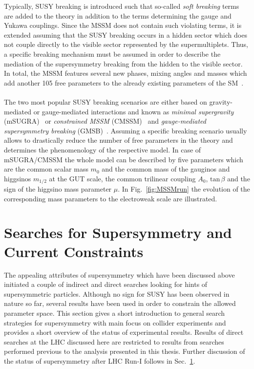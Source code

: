 Typically, SUSY breaking is introduced such that so-called \textit{soft breaking} terms are added to the theory in addition to the terms determining the gauge and Yukawa couplings. Since the MSSM does not contain such violating terms, it is extended assuming that the SUSY breaking occurs in a hidden sector which does not couple directly to the visible sector represented by the supermultiplets. Thus, a specific breaking mechanism must be assumed in order to describe the mediation of the supersymmetry breaking from the hidden to the visible sector. In total, the MSSM features several new phases, mixing angles and masses which add another 105 free parameters to the already existing parameters of the SM~\cite{Dimopoulos:1995ju}.  \\
\\
The two most popular SUSY breaking scenarios are either based on gravity-mediated or gauge-mediated interactions and known as \textit{minimal supergravity} (mSUGRA)~\cite{Chamseddine:1982jx, AlvarezGaume:1983gj} or \textit{constrained MSSM} (CMSSM)~\cite{Kane:1993td, Baer:2002gm} and \textit{gauge-mediated supersymmetry breaking} (GMSB)~\cite{Dine:1981gu, AlvarezGaume:1981wy}. Assuming a specific breaking scenario usually allows to drastically reduce the number of free parameters in the theory and determines the phenomenology of the respective model. In case of mSUGRA/CMSSM the whole model can be described by five parameters which are the common scalar mass $m_0$ and the common mass of the gauginos and higgsinos $m_{1/2}$ at the GUT scale, the common trilinear coupling $A_0$, $\mathrm{tan} \, \beta$ and the sign of the higgsino mass parameter $\mu$. In Fig.~\ref{fig:MSSMrun} the evolution of the corresponding mass parameters to the electroweak scale are illustrated.  

\section{Searches for Supersymmetry and Current Constraints}
\label{sec:susy_status}
The appealing attributes of supersymmetry which have been discussed above initiated a couple of indirect and direct searches looking for hints of supersymmetric particles. Although no sign for SUSY has been observed in nature so far, several results have been used in order to constrain the allowed parameter space. This section gives a short introduction to general search strategies for supersymmetry with main focus on collider experiments and provides a short overview of the status of experimental results. Results of direct searches at the LHC discussed here are restricted to results from searches performed previous to the analysis presented in this thesis. Further discussion of the status of supersymmetry after LHC Run-I follows in Sec.~\ref{sec:susy_status}.  

